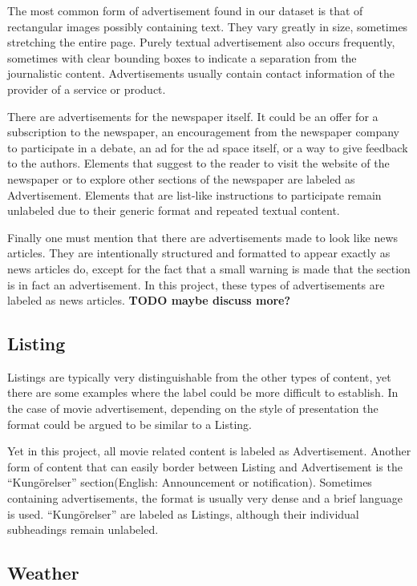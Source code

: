 \documentclass[english, bibtex]{kththesis}
\begin{document}
The most common form of advertisement found in our dataset is that of rectangular images possibly containing text. They vary greatly in size, sometimes stretching the entire page. Purely textual advertisement also occurs frequently, sometimes with clear bounding boxes to indicate a separation from the journalistic content. Advertisements usually contain contact information of the provider of a service or product. 

There are advertisements for the newspaper itself. It could be an offer for a subscription to the newspaper, an encouragement from the newspaper company to participate in a debate, an ad for the ad space itself, or a way to give feedback to the authors. Elements that suggest to the reader to visit the website of the newspaper or to explore other sections of the newspaper are labeled as Advertisement. Elements that are list-like instructions to participate remain unlabeled due to their generic format and repeated textual content.

Finally one must mention that there are advertisements made to look like news articles. They are intentionally structured and formatted to appear exactly as news articles do, except for the fact that a small warning is made that the section is in fact an advertisement. In this project, these types of advertisements are labeled as news articles. \textbf{TODO maybe discuss more?}

\subsection{Listing}

Listings are typically very distinguishable from the other types of content, yet there are some examples where the label could be more difficult to establish. In the case of movie advertisement, depending on the style of presentation the format could be argued to be similar to a Listing.

Yet in this project, all movie related content is labeled as Advertisement. Another form of content that can easily border between Listing and Advertisement is the “Kungörelser” section(English: Announcement or notification). Sometimes containing advertisements, the format is usually very dense and a brief language is used. “Kungörelser” are labeled as Listings, although their individual subheadings remain unlabeled.

\subsection{Weather}
\end{document}

